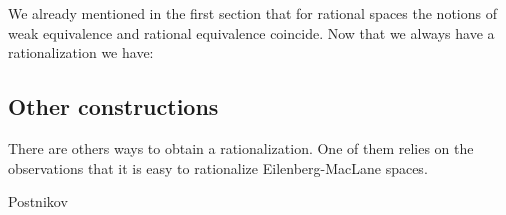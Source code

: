 We already mentioned in the first section that for rational spaces the notions of weak equivalence and rational equivalence coincide. Now that we always have a rationalization we have:



\subsection{Other constructions}
There are others ways to obtain a rationalization. One of them relies on the observations that it is easy to rationalize Eilenberg-MacLane spaces.


Postnikov
